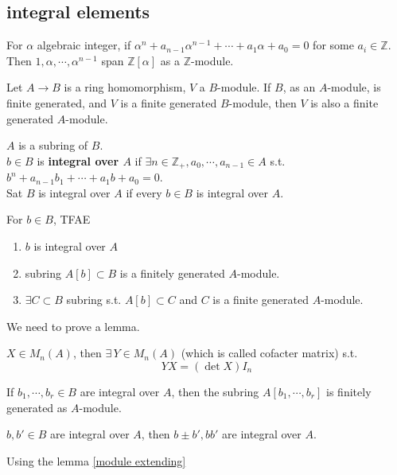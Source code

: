 \subsection{integral elements}
For  $ \alpha  $ algebraic integer, if  $ \alpha^n+a_{n-1}\alpha^{n-1}+\cdots+a_1\alpha+a_0=0 $ for some  $ a_i\in \mathbb{Z} $.\\
Then  $ 1,\alpha,\cdots,\alpha^{n-1} $ span  $ \mathbb{Z}[\alpha] $ as a  $  \mathbb{Z}  $-module.     
\begin{lemma}\label{module extending}
    Let  $ A\rightarrow B $ is a ring homomorphism,  $ V  $ a  $ B $-module. If  $ B  $, as an  $ A  $-module, is finite generated, and  $ V  $ is a finite generated  $ B  $-module, then  $ V  $ is also a finite generated  $ A  $-module. 
\end{lemma}
\begin{definition}
     $ A  $ is a subring of  $ B  $.\\
     $ b\in B  $ is \textbf{integral over  $ A  $} if  $ \exists n\in \mathbb{Z}_+,a_0,\cdots,a_{n-1}\in A $ s.t.  $ b^n+a_{n-1}b_1+\cdots+a_1b+a_0=0 $.\\
     Sat  $ B  $ is integral over  $ A  $ if every  $ b\in B  $ is integral over  $ A  $.  
\end{definition}
\begin{proposition}
    For  $ b\in B  $, TFAE
    \begin{enumerate}[(1)]
         \item  $ b  $ is integral over  $ A  $
         \item subring  $ A[b]\subset B $ is a finitely generated  $ A  $-module.
         \item  $ \exists C\subset B  $ subring s.t.  $ A[b]\subset C $ and  $ C  $ is a finite generated $ A  $-module. 
    \end{enumerate}
\end{proposition}
We need to prove a lemma.
\begin{lemma}
     $ X\in M_n(A) $, then  $ \exists \, Y\in M_n (A)$ (which is called cofacter matrix) s.t.
     \[YX=(\det X)I_n\]
\end{lemma}
\begin{lemma}
    If  $ b_1,\cdots,b_r\in B  $ are integral over  $ A  $, then the subring  $ A[b_1,\cdots,b_r] $ is finitely generated as  $ A $-module.   
\end{lemma}
\begin{corollary}\label{integral closed}
     $ b,b'\in B  $ are integral over  $ A  $, then   $ b\pm b',bb' $ are integral over  $ A $.  
\end{corollary}
\begin{hint}
    Using the lemma \ref{module extending}
\end{hint}

